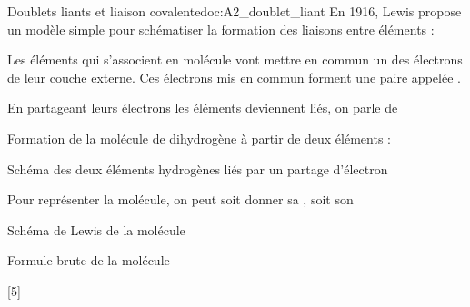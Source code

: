 \begin{doc}{Doublets liants et liaison covalente}{doc:A2_doublet_liant}
  En 1916, Lewis propose un modèle simple pour schématiser la formation des liaisons entre éléments :
  \begin{importants}  
    Les éléments qui s'associent en molécule vont mettre en commun un des électrons de leur couche externe.
    Ces électrons mis en commun forment une paire appelée .
  \end{importants}
  \begin{importants}  
    En partageant leurs électrons les éléments deviennent liés, on parle de 
  \end{importants}

  
  \exemple Formation de la molécule de dihydrogène  à partir de deux éléments  :
  
  \begin{center}
    {\small Schéma des deux éléments hydrogènes liés par un partage d'électron}
    \vspace{8pt}
    
  \end{center}

  Pour représenter la molécule, on peut soit donner sa , soit son 
  \begin{multicols}{2}
    \begin{center}
      Schéma de Lewis de la molécule \\[4pt]

      {\Large {}}
    \end{center}

    \begin{center}
      Formule brute de la molécule \\[4pt]

      {\Large {}}
    \end{center}
  \end{multicols}
\end{doc}

\newpage
{}[5]

